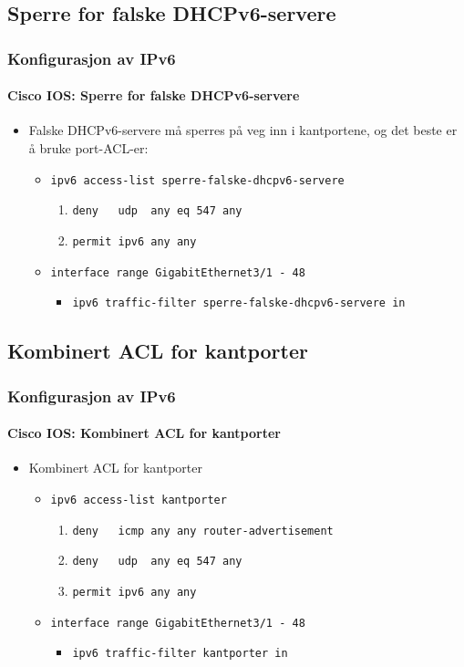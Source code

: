 \subsection{Sperre for falske DHCPv6-servere}
\begin{frame}%
  \frametitle{Konfigurasjon av IPv6}
  \framesubtitle{Cisco IOS: Sperre for falske DHCPv6-servere}
  \begin{itemize}%
  \item Falske DHCPv6-servere må sperres på veg \alert{inn i
      kantportene}, og det beste er å bruke port-ACL-er:
    \begin{itemize}%
    \item \texttt{ipv6 access-list sperre-falske-dhcpv6-servere}
      \begin{enumerate}%
      \item \texttt{deny\ \ \ udp\ \ any eq 547           any}
      \item \texttt{permit    ipv6   any \phantom{eq 547} any}
      \end{enumerate}
    \item \texttt{interface range GigabitEthernet3/1 - 48}
      \begin{itemize}%
      \item \texttt{ipv6 traffic-filter sperre-falske-dhcpv6-servere in}
      \end{itemize}
    \end{itemize}
  \end{itemize}
\end{frame}

\subsection{Kombinert ACL for kantporter}
\begin{frame}%
  \frametitle{Konfigurasjon av IPv6}
  \framesubtitle{Cisco IOS: Kombinert ACL for kantporter}
  \begin{itemize}%
  \item Kombinert ACL for kantporter
    \begin{itemize}%
    \item \texttt{ipv6 access-list kantporter}
      \begin{enumerate}%
      \item \texttt{deny\ \ \ icmp   any \phantom{eq 547} any router-advertisement}
      \item \texttt{deny\ \ \ udp\ \ any eq 547           any}
      \item \texttt{permit    ipv6   any \phantom{eq 547} any}
      \end{enumerate}
    \item \texttt{interface range GigabitEthernet3/1 - 48}
      \begin{itemize}%
      \item \texttt{ipv6 traffic-filter kantporter in}
      \end{itemize}
    \end{itemize}
  \end{itemize}
\end{frame}

